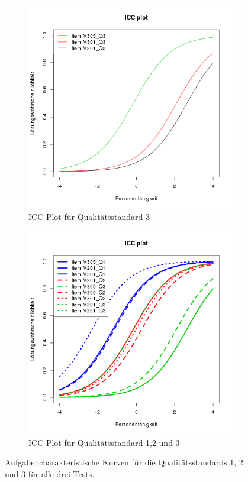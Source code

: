  \begin{figure}[htbp]
 \ContinuedFloat %
 \centering
 \begin{subfigure}{0.49\textwidth}
   \includegraphics[width=1.0\linewidth]{graphics/ICCQ3.png}
   \caption{ICC Plot für Qualitätsstandard 3}
   \label{fig:ICCQ3}
 \end{subfigure}
 \begin{subfigure}{0.49\textwidth}
   \includegraphics[width=1.0\linewidth]{graphics/ICCQ123.png}
   \caption{ICC Plot für Qualitätsstandard 1,2 und 3}
   \label{fig:ICCQ123}
 \end{subfigure}
 
 \caption{Aufgabencharakteristische Kurven für die Qualitätsstandards 1, 2 und 3 für alle drei Tests.}
 \label{fig:corLevRasch}
 \end{figure}
 
